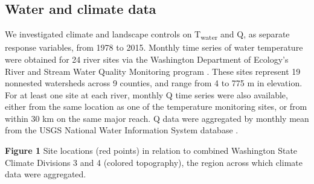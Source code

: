 \documentclass[notitlepage]{article}
\begin{document}
\subsection*{Water and climate data}

We investigated climate and landscape controls on T\textsubscript{water} and Q, as separate response variables, from 1978 to 2015. Monthly time series of water temperature were obtained for 24 river sites via the Washington Department of Ecology's River and Stream Water Quality Monitoring program \citep{DoEwaterData}. These sites represent 19 nonnested watersheds across 9 counties, and range from 4 to 775 m in elevation. For at least one site at each river, monthly Q time series were also available, either from the same location as one of the temperature monitoring sites, or from within 30 km on the same major reach. Q data were aggregated by monthly mean from the USGS National Water Information System database \citep{USGSdischarge}.

\begin{center}
\textbf{Figure 1} Site locations (red points) in relation to combined Washington State Climate Divisions 3 and 4 (colored topography), the region across which climate data were aggregated.
\end{center}
\end{document}
